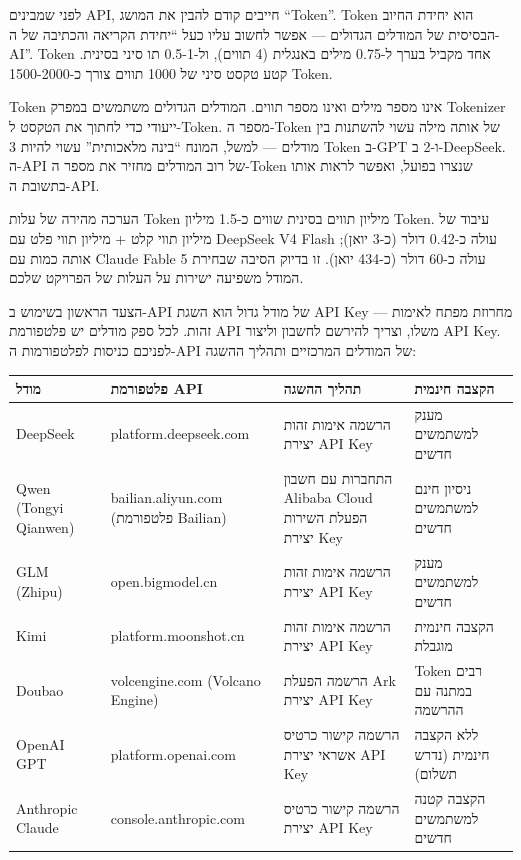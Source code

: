 
לפני שמבינים API, חייבים קודם להבין את המושג “Token”. Token הוא יחידת החיוב הבסיסית של המודלים הגדולים — אפשר לחשוב עליו כעל “יחידת הקריאה והכתיבה של ה-AI”. Token אחד מקביל בערך ל-0.75 מילים באנגלית (4 תווים), ול-0.5-1 תו סיני בסינית. קטע טקסט סיני של 1000 תווים צורך כ-1500-2000 Token.

Token אינו מספר מילים ואינו מספר תווים. המודלים הגדולים משתמשים במפרק Tokenizer ייעודי כדי לחתוך את הטקסט ל-Token. מספר ה-Token של אותה מילה עשוי להשתנות בין מודלים — למשל, המונח “בינה מלאכותית” עשוי להיות 3 Token ב-GPT ו-2 ב-DeepSeek. ה-API של רוב המודלים מחזיר את מספר ה-Token שנצרו בפועל, ואפשר לראות אותו בתשובת ה-API.

\begin{tcbinfo}{הערכה מהירה של עלות Token}
מיליון תווים בסינית שווים כ-1.5 מיליון Token. עיבוד של מיליון תווי קלט + מיליון תווי פלט עם DeepSeek V4 Flash עולה כ-0.42 דולר (כ-3 יואן); אותה כמות עם Claude Fable 5 עולה כ-60 דולר (כ-434 יואן). זו בדיוק הסיבה שבחירת המודל משפיעה ישירות על העלות של הפרויקט שלכם.

\end{tcbinfo}


הצעד הראשון בשימוש ב-API של מודל גדול הוא השגת API Key — מחרוזת מפתח לאימות זהות. לכל ספק מודלים יש פלטפורמת API משלו, וצריך להירשם לחשבון וליצור API Key. לפניכם כניסות לפלטפורמות ה-API של המודלים המרכזיים ותהליך ההשגה:

\begin{center}
\begin{tabularx}{\linewidth}{|X|X|X|X|}
\hline
\textbf{מודל} & \textbf{פלטפורמת API} & \textbf{תהליך ההשגה} & \textbf{הקצבה חינמית} \tabularnewline
\hline
DeepSeek & platform.deepseek.com & הרשמה אימות זהות יצירת API Key & מענק למשתמשים חדשים \tabularnewline
Qwen (Tongyi Qianwen) & bailian.aliyun.com (פלטפורמת Bailian) & התחברות עם חשבון Alibaba Cloud הפעלת השירות יצירת Key & ניסיון חינם למשתמשים חדשים \tabularnewline
GLM (Zhipu) & open.bigmodel.cn & הרשמה אימות זהות יצירת API Key & מענק למשתמשים חדשים \tabularnewline
Kimi & platform.moonshot.cn & הרשמה אימות זהות יצירת API Key & הקצבה חינמית מוגבלת \tabularnewline
Doubao & volcengine.com (Volcano Engine) & הרשמה הפעלת Ark יצירת API Key & Token רבים במתנה עם ההרשמה \tabularnewline
OpenAI GPT & platform.openai.com & הרשמה קישור כרטיס אשראי יצירת API Key & ללא הקצבה חינמית (נדרש תשלום) \tabularnewline
Anthropic Claude & console.anthropic.com & הרשמה קישור כרטיס יצירת API Key & הקצבה קטנה למשתמשים חדשים \tabularnewline
\hline
\end{tabularx}
\end{center}

